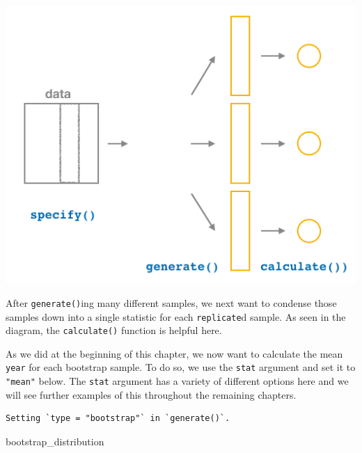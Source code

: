 \documentclass[12pt, krantz2,]{krantz}
\makeatletter
\newenvironment{Shaded}{\begin{snugshade}}{\end{snugshade}}
\newcommand{\DataTypeTok}[1]{\textcolor[rgb]{0.27,0.27,0.27}{#1}}
\newcommand{\DecValTok}[1]{\textcolor[rgb]{0.06,0.06,0.06}{#1}}
\newcommand{\KeywordTok}[1]{\textcolor[rgb]{0.27,0.27,0.27}{\textbf{#1}}}
\newcommand{\NormalTok}[1]{#1}
\newcommand{\OperatorTok}[1]{\textcolor[rgb]{0.43,0.43,0.43}{\textbf{#1}}}
\newcommand{\StringTok}[1]{\textcolor[rgb]{0.5,0.5,0.5}{#1}}
\newenvironment{kframe}{%
\medskip{}
\setlength{\fboxsep}{.8em}
 \def\at@end@of@kframe{}%
 \ifinner\ifhmode%
  \def\at@end@of@kframe{\end{minipage}}%
  \begin{minipage}{\columnwidth}%
 \fi\fi%
 \def\FrameCommand##1{\hskip\@totalleftmargin \hskip-\fboxsep
 \colorbox{shadecolor}{##1}\hskip-\fboxsep
     \hskip-\linewidth \hskip-\@totalleftmargin \hskip\columnwidth}%
 \MakeFramed {\advance\hsize-\width
   \@totalleftmargin\z@ \linewidth\hsize
   \@setminipage}}%
 {\par\unskip\endMakeFramed%
 \at@end@of@kframe}
\renewenvironment{Shaded}{\begin{kframe}}{\end{kframe}}
\makeatother
\begin{document}
\begin{center}\includegraphics[width=0.7\linewidth]{images/flowcharts/infer/calculate} \end{center}

After \texttt{generate()}ing many different samples, we next want to condense those samples down into a single statistic for each \texttt{replicate}d sample. As seen in the diagram, the \texttt{calculate()} function is helpful here.

As we did at the beginning of this chapter, we now want to calculate the mean \texttt{year} for each bootstrap sample. To do so, we use the \texttt{stat} argument and set it to \texttt{"mean"} below. The \texttt{stat} argument has a variety of different options here and we will see further examples of this throughout the remaining chapters.

\begin{Shaded}
\end{Shaded}

\begin{verbatim}
Setting `type = "bootstrap"` in `generate()`.
\end{verbatim}

\begin{Shaded}
\begin{Highlighting}[]
\NormalTok{bootstrap_distribution}
\end{Highlighting}
\end{Shaded}
\end{document}
